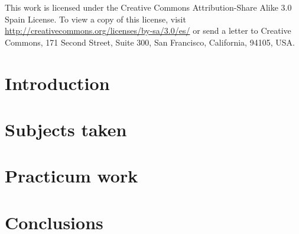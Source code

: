 \documentclass[11pt, a4paper, twoside, titlepage]{report}
\newcommand{\paginaenblanco}{\mbox{}\thispagestyle{empty}\newpage}
\begin{document}


\makeatletter
\def\cleardoublepage{\clearpage\if@twoside \ifodd\c@page\else
  \hbox{}
    \thispagestyle{empty}
      \newpage
        \if@twocolumn\hbox{}\newpage\fi\fi\fi}
\makeatother

\tableofcontents
\newpage
\mbox{}\vfill
This work is licensed under the Creative Commons Attribution-Share Alike 3.0 Spain License. To view a copy of this license, visit \url{http://creativecommons.org/licenses/by-sa/3.0/es/} or send a letter to Creative Commons, 171 Second Street, Suite 300, San Francisco, California, 94105, USA.
\newpage

\chapter{Introduction}



\chapter{Subjects taken}



\chapter{Practicum work}



\chapter{Conclusions}




\paginaenblanco


\end{document}
